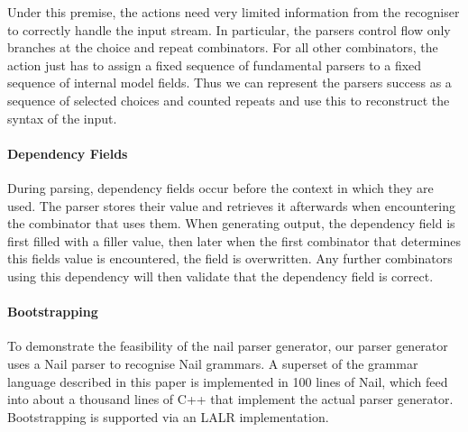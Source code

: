 Under this premise, the actions need very limited information from the recogniser to correctly
handle the input stream. In particular, the parsers control flow only branches at the choice and
repeat combinators. For all other combinators, the action just has to assign a fixed sequence of
fundamental parsers to a fixed sequence of internal model fields. 
Thus we can represent the parsers success as a sequence of selected choices and counted repeats and
use this to reconstruct the syntax of the input. %
\paragraph{Dependency Fields}
During parsing, dependency fields occur before the context in which they are used. The parser stores
their value and retrieves it afterwards when encountering the combinator that uses them. When
generating output, the dependency field is first filled with a filler value, then later when the
first combinator that determines this fields value is encountered, the field is overwritten. Any
further combinators using this dependency will then validate that the dependency field is correct. 
\paragraph{Bootstrapping}
To demonstrate the feasibility of the nail parser generator, our parser generator uses a Nail parser
to recognise Nail grammars. A superset of the grammar language described in this paper is
implemented in 100 lines of Nail, which feed into about a thousand lines of C++ that implement the
actual parser generator. Bootstrapping is supported via an LALR implementation.
